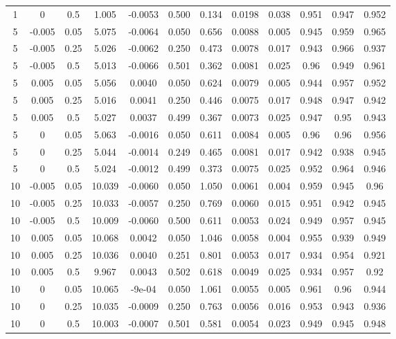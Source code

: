 \documentclass[12pt,english]{article}
\begin{document}
\begin{spacing}{1.9}
\begin{flushleft}
\begin{table}[htb]
\begin{tabular}{cccccccccccc}
1	&0	&0.5	&1.005		&-0.0053	&0.500	&0.134	&0.0198	&0.038	&0.951	&0.947	&0.952\\
5	&-0.005	&0.05	&5.075	&-0.0064	&0.050	&0.656	&0.0088	&0.005	&0.945	&0.959	&0.965\\
5	&-0.005	&0.25	&5.026	&-0.0062	&0.250	&0.473	&0.0078	&0.017	&0.943	&0.966	&0.937\\
5	&-0.005	&0.5	&5.013	&-0.0066	&0.501	&0.362	&0.0081	&0.025	&0.96	&0.949	&0.961\\
5	&0.005	&0.05	&5.056	&0.0040		&0.050	&0.624	&0.0079	&0.005	&0.944	&0.957	&0.952\\
5	&0.005	&0.25	&5.016	&0.0041		&0.250	&0.446	&0.0075	&0.017	&0.948	&0.947	&0.942\\
5	&0.005	&0.5	&5.027	&0.0037		&0.499	&0.367	&0.0073	&0.025	&0.947	&0.95	&0.943\\
5	&0	&0.05		&5.063	&-0.0016	&0.050	&0.611	&0.0084	&0.005	&0.96	&0.96	&0.956\\
5	&0	&0.25		&5.044	&-0.0014	&0.249	&0.465	&0.0081	&0.017	&0.942	&0.938	&0.945\\
5	&0	&0.5		&5.024	&-0.0012	&0.499	&0.373	&0.0075	&0.025	&0.952	&0.964	&0.946\\
10	&-0.005	&0.05	&10.039	&-0.0060	&0.050	&1.050	&0.0061	&0.004	&0.959	&0.945	&0.96\\
10	&-0.005	&0.25	&10.033	&-0.0057	&0.250	&0.769	&0.0060	&0.015 &0.951	&0.942	&0.945\\
10	&-0.005	&0.5	&10.009	&-0.0060	&0.500	&0.611	&0.0053	&0.024	&0.949	&0.957	&0.945\\
10	&0.005	&0.05	&10.068	&0.0042		&0.050	&1.046	&0.0058	&0.004	&0.955	&0.939	&0.949\\
10	&0.005	&0.25	&10.036	&0.0040		&0.251	&0.801	&0.0053	&0.017	&0.934	&0.954	&0.921\\
10	&0.005	&0.5	&9.967	&0.0043		&0.502	&0.618	&0.0049	&0.025	&0.934	&0.957	&0.92\\
10	&0	&0.05	&10.065		&-9e-04	      &0.050	&1.061	&0.0055	&0.005	&0.961	&0.96	&0.944\\
10	&0	&0.25	&10.035		&-0.0009	&0.250	&0.763	&0.0056	&0.016	&0.953	&0.943	&0.936\\
10	&0	&0.5	&10.003		&-0.0007	&0.501	&0.581	&0.0054	&0.023	&0.949	&0.945	&0.948\\
  \hline
  \end{tabular}
  \label{tab:simexp}
\end{table}
\clearpage


\end{flushleft}
\end{spacing}
\end{document}
